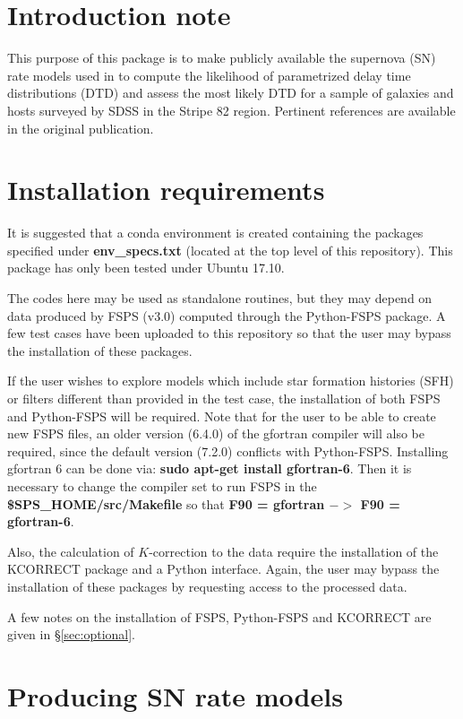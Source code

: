 \documentclass[manuscript]{aastex}
\begin{document}
\section{Introduction note}
\label{sec:intro}

This purpose of this package is to make publicly available the supernova (SN) rate models used in \citet{Heringer2017_DTD} to compute the likelihood of parametrized delay time distributions (DTD) and assess the most likely DTD for a sample of galaxies and hosts surveyed by SDSS in the Stripe 82 region. Pertinent references are available in the original publication.

\section{Installation requirements}
\label{sec:requirements}

It is suggested that a conda environment is created containing the packages specified under \textbf{env\_specs.txt} (located at the top level of this repository). This package has only been tested under Ubuntu 17.10.

The codes here may be used as standalone routines, but they
may depend on data produced by FSPS (v3.0) computed through the Python-FSPS package. A few test cases have been uploaded to this repository so that the user may bypass the installation of these packages.

If the user wishes to explore models which include
star formation histories (SFH) or filters different than provided in the test case, the installation of both FSPS and Python-FSPS will be required. Note that for the user to be able to create new FSPS files, an older version (6.4.0) of the gfortran compiler will also be required, since the default version (7.2.0) conflicts with Python-FSPS. Installing gfortran 6 can be done via: \textbf{sudo apt-get install gfortran-6}. Then it is necessary to change the compiler set to run FSPS in the \textbf{\$SPS\_HOME/src/Makefile} so that \textbf{F90 = gfortran $->$ F90 = gfortran-6}.


Also, the calculation of $K$-correction to the data require the installation of the KCORRECT package \citep{Blanton2007_kcorrect} and a Python interface. Again, the user may bypass the installation of these packages by requesting access to the processed data.

A few notes on the installation of FSPS, Python-FSPS and KCORRECT are given in \S \ref{sec:optional}.

\section{Producing SN rate models}
\label{sec:usage}
\end{document}
